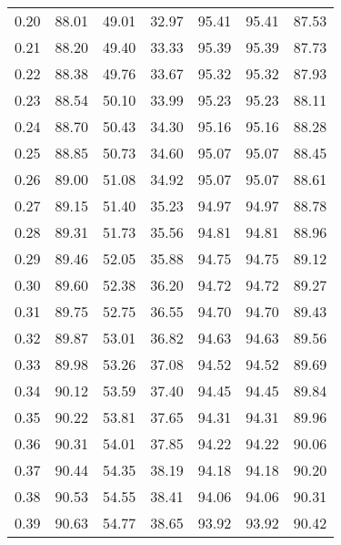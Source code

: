 \begin{tabular}{|c|c|c|c|c|c|c|}
      0.20 &     88.01 &     49.01 &      32.97 &   95.41 &      95.41 &         87.53 \\
      0.21 &     88.20 &     49.40 &      33.33 &   95.39 &      95.39 &         87.73 \\
      0.22 &     88.38 &     49.76 &      33.67 &   95.32 &      95.32 &         87.93 \\
      0.23 &     88.54 &     50.10 &      33.99 &   95.23 &      95.23 &         88.11 \\
      0.24 &     88.70 &     50.43 &      34.30 &   95.16 &      95.16 &         88.28 \\
      0.25 &     88.85 &     50.73 &      34.60 &   95.07 &      95.07 &         88.45 \\
      0.26 &     89.00 &     51.08 &      34.92 &   95.07 &      95.07 &         88.61 \\
      0.27 &     89.15 &     51.40 &      35.23 &   94.97 &      94.97 &         88.78 \\
      0.28 &     89.31 &     51.73 &      35.56 &   94.81 &      94.81 &         88.96 \\
      0.29 &     89.46 &     52.05 &      35.88 &   94.75 &      94.75 &         89.12 \\
      0.30 &     89.60 &     52.38 &      36.20 &   94.72 &      94.72 &         89.27 \\
      0.31 &     89.75 &     52.75 &      36.55 &   94.70 &      94.70 &         89.43 \\
      0.32 &     89.87 &     53.01 &      36.82 &   94.63 &      94.63 &         89.56 \\
      0.33 &     89.98 &     53.26 &      37.08 &   94.52 &      94.52 &         89.69 \\
      0.34 &     90.12 &     53.59 &      37.40 &   94.45 &      94.45 &         89.84 \\
      0.35 &     90.22 &     53.81 &      37.65 &   94.31 &      94.31 &         89.96 \\
      0.36 &     90.31 &     54.01 &      37.85 &   94.22 &      94.22 &         90.06 \\
      0.37 &     90.44 &     54.35 &      38.19 &   94.18 &      94.18 &         90.20 \\
      0.38 &     90.53 &     54.55 &      38.41 &   94.06 &      94.06 &         90.31 \\
      0.39 &     90.63 &     54.77 &      38.65 &   93.92 &      93.92 &         90.42 \\

\end{tabular}
